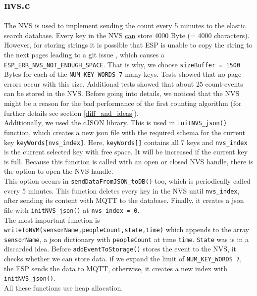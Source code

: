 \subsection{nvs.c}\label{nvs}
The NVS is used to implement sending the count every 5 minutes to the elastic search database.
Every key in the NVS \underline{can} store 4000 Byte (= 4000 characters). However, for storing
strings it is possible that ESP is unable to copy the string to the next pages leading to a git issue
\cite{gitPagesNVS}, which causes a \verb!ESP_ERR_NVS_NOT_ENOUGH_SPACE!. That is why, we
choose \verb!sizeBuffer = 1500! Bytes for each of the \verb!NUM_KEY_WORDS 7! many keys. Tests showed
that no page errors occur with this size. Additional tests showed that about
25 count-events can be stored in the NVS.
Before going into details, we noticed that the NVS might be a reason for the bad performance of
the first counting algorithm (for further details see section \ref{diff_and_ideas}).\\
Additionally, we used the cJSON library. This is used in \verb!initNVS_json()! function, which creates
a new json file with the required schema for the current key \verb!keyWords[nvs_index]!.
Here, \verb!keyWords[]! contains all
7 keys and \verb!nvs_index! is the current selected key with free space. It will be increased if the current key
is full.
Because this function is called with an open
or closed NVS handle, there is the option to open the NVS handle.\\
This option occurs in \verb!sendDataFromJSON_toDB()! too, which is periodically called every 5 minutes.
This function deletes every key in the NVS until \verb!nvs_index!,
after sending its content with MQTT to the database. Finally, it creates a json file with
\verb!initNVS_json()! at \verb!nvs_index = 0!.\\
The most important function is \verb!writeToNVM(sensorName,peopleCount,state,time)! which appends to
the array \verb!sensorName!, a json dictionary with \verb!peopleCount! at time \verb!time!.
\verb!State! was is in a discarded idea. Before \verb!addEventToStorage()!
stores the event to the NVS, it checks whether we can store data.
if we expand the limit of \verb!NUM_KEY_WORDS 7!,
the ESP sends the data to MQTT, otherwise, it creates a new index with \verb!initNVS_json()!.\\
All these functions use heap allocation.


